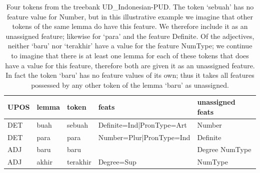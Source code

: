 \documentclass[USenglish]{article}
\begin{document}
\begin{table}[h]
    \centering
    \caption{Four tokens from the treebank UD\_Indonesian-PUD. The token `sebuah' has no feature value for Number, but in this illustrative example we imagine that other tokens of the same lemma do have this feature. We therefore include it as an unassigned feature; likewise for `para' and the feature Definite. Of the adjectives, neither `baru' nor `terakhir' have a value for the feature NumType; we continue to imagine that there is at least one lemma for each of these tokens that does have a value for this feature, therefore both are given it as an unassigned feature. In fact the token `baru' has no feature values of its own; thus it takes all features possessed by any other token of the lemma `baru' as unassigned.} %
    \label{tab:unassigned_ex}   
    \begin{tabular}{p{1cm}p{1.4cm}p{1.5cm}p{3.5cm}p{2.5cm}}
\toprule

UPOS&lemma	&token	&feats & unassigned feats	\\ 
\midrule
DET & buah & sebuah 
& Definite=Ind|PronType=Art
& Number
\\\midrule
DET & para	& para	&Number=Plur|PronType=Ind & Definite
\\\midrule
ADJ&baru	&baru&
& Degree \newline
NumType 
\\\midrule
ADJ & akhir	&terakhir&	Degree=Sup& NumType\\\bottomrule
\end{tabular}
\end{table}
\end{document}
